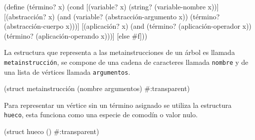 \nwenddocs{}\endmoddef
(define (término? x)
  (cond
   [(variable? x)    (string? (variable-nombre x))]
   [(abstracción? x) (and (variable? (abstracción-argumento x))
                          (término? (abstracción-cuerpo x)))]
   [(aplicación? x)  (and (término? (aplicación-operador x))
                          (término? (aplicación-operando x)))]
   [else             #f]))

\eatline
{}\nwendcode{}\nwdocspar
La estructura que representa a las metainstrucciones de un árbol es llamada {\tt{}\protect{}metainstrucción}, se compone de una cadena de caracteres llamada {\tt{}nombre} y de una lista de vértices llamada {\tt{}argumentos}.

\nwenddocs{}\plusendmoddef
(struct metainstrucción (nombre argumentos) #:transparent)

\eatline
{}\nwendcode{}\nwdocspar

Para representar un vértice sin un término asignado se utiliza la estructura {\tt{}\protect{}hueco}, esta funciona como una especie de comodín o valor nulo.


\nwenddocs{}\plusendmoddef
(struct hueco () #:transparent)

